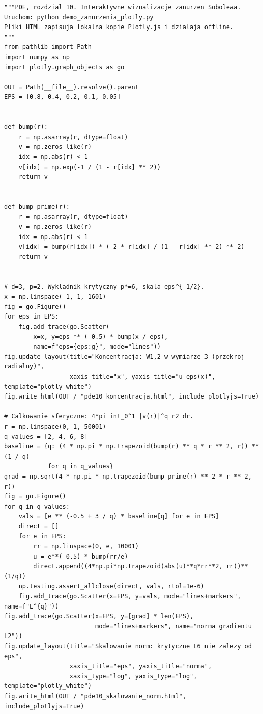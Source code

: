 \begin{lstlisting}[style=pythonpde,caption={Koncentracja i ostrosc zanurzen Sobolewa - Plotly},label={code:pde-embed10}]
"""PDE, rozdzial 10. Interaktywne wizualizacje zanurzen Sobolewa.
Uruchom: python demo_zanurzenia_plotly.py
Pliki HTML zapisuja lokalna kopie Plotly.js i dzialaja offline.
"""
from pathlib import Path
import numpy as np
import plotly.graph_objects as go

OUT = Path(__file__).resolve().parent
EPS = [0.8, 0.4, 0.2, 0.1, 0.05]


def bump(r):
    r = np.asarray(r, dtype=float)
    v = np.zeros_like(r)
    idx = np.abs(r) < 1
    v[idx] = np.exp(-1 / (1 - r[idx] ** 2))
    return v


def bump_prime(r):
    r = np.asarray(r, dtype=float)
    v = np.zeros_like(r)
    idx = np.abs(r) < 1
    v[idx] = bump(r[idx]) * (-2 * r[idx] / (1 - r[idx] ** 2) ** 2)
    return v


# d=3, p=2. Wykladnik krytyczny p*=6, skala eps^{-1/2}.
x = np.linspace(-1, 1, 1601)
fig = go.Figure()
for eps in EPS:
    fig.add_trace(go.Scatter(
        x=x, y=eps ** (-0.5) * bump(x / eps),
        name=f"eps={eps:g}", mode="lines"))
fig.update_layout(title="Koncentracja: W1,2 w wymiarze 3 (przekroj radialny)",
                  xaxis_title="x", yaxis_title="u_eps(x)", template="plotly_white")
fig.write_html(OUT / "pde10_koncentracja.html", include_plotlyjs=True)

# Calkowanie sferyczne: 4*pi int_0^1 |v(r)|^q r2 dr.
r = np.linspace(0, 1, 50001)
q_values = [2, 4, 6, 8]
baseline = {q: (4 * np.pi * np.trapezoid(bump(r) ** q * r ** 2, r)) ** (1 / q)
            for q in q_values}
grad = np.sqrt(4 * np.pi * np.trapezoid(bump_prime(r) ** 2 * r ** 2, r))
fig = go.Figure()
for q in q_values:
    vals = [e ** (-0.5 + 3 / q) * baseline[q] for e in EPS]
    direct = []
    for e in EPS:
        rr = np.linspace(0, e, 10001)
        u = e**(-0.5) * bump(rr/e)
        direct.append((4*np.pi*np.trapezoid(abs(u)**q*rr**2, rr))**(1/q))
    np.testing.assert_allclose(direct, vals, rtol=1e-6)
    fig.add_trace(go.Scatter(x=EPS, y=vals, mode="lines+markers", name=f"L^{q}"))
fig.add_trace(go.Scatter(x=EPS, y=[grad] * len(EPS),
                         mode="lines+markers", name="norma gradientu L2"))
fig.update_layout(title="Skalowanie norm: krytyczne L6 nie zalezy od eps",
                  xaxis_title="eps", yaxis_title="norma",
                  xaxis_type="log", yaxis_type="log", template="plotly_white")
fig.write_html(OUT / "pde10_skalowanie_norm.html", include_plotlyjs=True)


\end{lstlisting}
